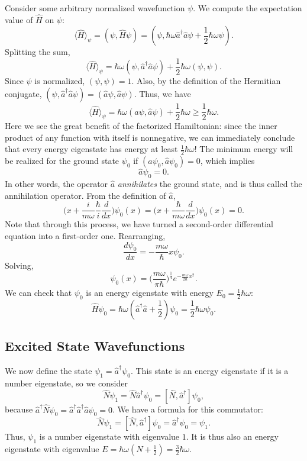 Consider some arbitrary normalized wavefunction $\psi$. We compute the expectation value of $\hat{H}$ on $\psi$: $$\langle\hat{H}\rangle_\psi=(\psi,\hat{H}\psi)=(\psi,\hbar\omega\hat{a}^\dagger\hat{a}\psi+\frac{1}{2}\hbar\omega\psi).$$Splitting the sum, $$\langle\hat{H}\rangle_\psi=\hbar\omega(\psi,\hat{a}^\dagger\hat{a}\psi)+\frac{1}{2}\hbar\omega(\psi,\psi).$$Since $\psi$ is normalized, $(\psi,\psi)=1$. Also, by the definition of the Hermitian conjugate, $(\psi,\hat{a}^\dagger\hat{a}\psi)=(\hat{a}\psi,\hat{a}\psi)$. Thus, we have $$\langle\hat{H}\rangle_\psi=\hbar\omega(\hat{a}\psi,\hat{a}\psi)+\frac{1}{2}\hbar\omega\geq\frac{1}{2}\hbar\omega.$$Here we see the great benefit of the factorized Hamiltonian: since the inner product of any function with itself is nonnegative, we can immediately conclude that every energy eigenstate has energy at least $\frac{1}{2}\hbar\omega$! The minimum energy will be realized for the ground state $\psi_0$ if $(\hat{a}\psi_0,\hat{a}\psi_0)=0$, which implies $$\hat{a}\psi_0=0.$$In other words, the operator $\hat{a}$ \textit{annihilates} the ground state, and is thus called the annihilation operator. From the definition of $\hat{a}$, $$\bigg(x+\frac{i}{m\omega}\frac{\hbar}{i}\frac{d}{dx}\bigg)\psi_0(x)=\bigg(x+\frac{\hbar}{m\omega}\frac{d}{dx}\bigg)\psi_0(x)=0.$$Note that through this process, we have turned a second-order differential equation into a first-order one. Rearranging, $$\frac{d\psi_0}{dx}=-\frac{m\omega}{\hbar}x\psi_0.$$Solving, $$\boxed{\psi_0(x)=\bigg(\frac{m\omega}{\pi\hbar}\bigg)^{\frac{1}{4}}e^{-\frac{m\omega}{2\hbar}x^2}.}$$We can check that $\psi_0$ is an energy eigenstate with energy $E_0=\frac{1}{2}\hbar\omega$: $$\hat{H}\psi_0=\hbar\omega(\hat{a}^\dagger\hat{a}+\frac{1}{2})\psi_0=\frac{1}{2}\hbar\omega\psi_0.$$

\subsection{Excited State Wavefunctions} \label{excited_states_harmonic_oscillator}

We now define the state $\psi_1=\hat{a}^\dagger\psi_0$. This state is an energy eigenstate if it is a number eigenstate, so we consider $$\hat{N}\psi_1=\hat{N}\hat{a}^\dagger\psi_0=[\hat{N},\hat{a}^\dagger]\psi_0,$$because $\hat{a}^\dagger\hat{N}\psi_0=\hat{a}^\dagger\hat{a}^\dagger\hat{a}\psi_0=0$. We have a formula for this commutator: $$\hat{N}\psi_1=[\hat{N},\hat{a}^\dagger]\psi_0=\hat{a}^\dagger\psi_0=\psi_1.$$Thus, $\psi_1$ is a number eigenstate with eigenvalue $1$. It is thus also an energy eigenstate with eigenvalue $E=\hbar\omega(N+\frac{1}{2})=\frac{3}{2}\hbar\omega$.  


